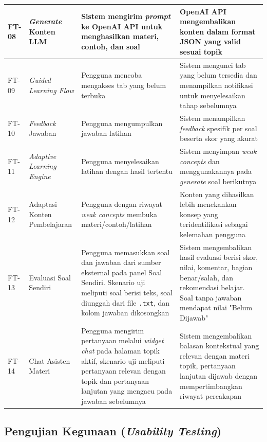 \begin{longtable}{|L{0.9cm}|L{2.3cm}|L{4.4cm}|L{4.4cm}|}
FT-08 & \textit{Generate} Konten LLM &
Sistem mengirim \textit{prompt} ke OpenAI API untuk menghasilkan materi, contoh, dan soal &
OpenAI API mengembalikan konten dalam format JSON yang valid sesuai topik \\
\hline

FT-09 & \textit{Guided Learning Flow} &
Pengguna mencoba mengakses tab yang belum terbuka &
Sistem mengunci tab yang belum tersedia dan menampilkan notifikasi untuk menyelesaikan tahap sebelumnya \\
\hline

FT-10 & \textit{Feedback} Jawaban &
Pengguna mengumpulkan jawaban latihan &
Sistem menampilkan \textit{feedback} spesifik per soal beserta skor yang akurat \\
\hline

FT-11 & \textit{Adaptive Learning Engine} &
Pengguna menyelesaikan latihan dengan hasil tertentu &
Sistem menyimpan \textit{weak concepts} dan menggunakannya pada \textit{generate} soal berikutnya \\
\hline

FT-12 & Adaptasi Konten Pembelajaran &
Pengguna dengan riwayat \textit{weak concepts} membuka materi/contoh/latihan &
Konten yang dihasilkan lebih menekankan konsep yang teridentifikasi sebagai kelemahan pengguna \\
\hline

FT-13 & Evaluasi Soal Sendiri &
Pengguna memasukkan soal dan jawaban dari sumber eksternal pada panel Soal Sendiri. Skenario uji meliputi soal berisi teks, soal diunggah dari file \texttt{.txt}, dan kolom jawaban dikosongkan &
Sistem mengembalikan hasil evaluasi berisi skor, nilai, komentar, bagian benar/salah, dan rekomendasi belajar. Soal tanpa jawaban mendapat nilai "Belum Dijawab" \\
\hline

FT-14 & Chat Asisten Materi &
Pengguna mengirim pertanyaan melalui \textit{widget chat} pada halaman topik aktif, skenario uji meliputi pertanyaan relevan dengan topik dan pertanyaan lanjutan yang mengacu pada jawaban sebelumnya &
Sistem mengembalikan balasan kontekstual yang relevan dengan materi topik, pertanyaan lanjutan dijawab dengan mempertimbangkan riwayat percakapan \\
\hline

\end{longtable}


\subsection{Pengujian Kegunaan (\textit{Usability Testing})}

